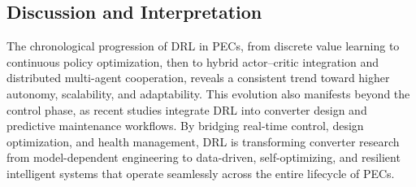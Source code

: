 \subsection{Discussion and Interpretation}

The chronological progression of DRL in PECs, from discrete value learning to continuous policy optimization, then to hybrid actor--critic integration and distributed multi-agent cooperation, 
reveals a consistent trend toward higher autonomy, scalability, and adaptability.  
This evolution also manifests beyond the control phase, as recent studies integrate DRL into converter design and predictive maintenance workflows.  
By bridging real-time control, design optimization, and health management, DRL is transforming converter research from model-dependent engineering to data-driven, self-optimizing, and resilient intelligent systems that operate seamlessly across the entire lifecycle of PECs.

